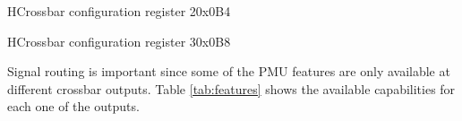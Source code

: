  \begin{register}{H}{Crossbar configuration register 2}{0x0B4}
	\label{cross_cfg2}
	\regnewline
\end{register}

 \begin{register}{H}{Crossbar configuration register 3}{0x0B8}
	\label{cross_cfg3}
	\regnewline
\end{register}
Signal routing is important since some of the PMU features are only available at different crossbar outputs. Table \ref{tab:features} shows the available capabilities for each one of the outputs.\\
